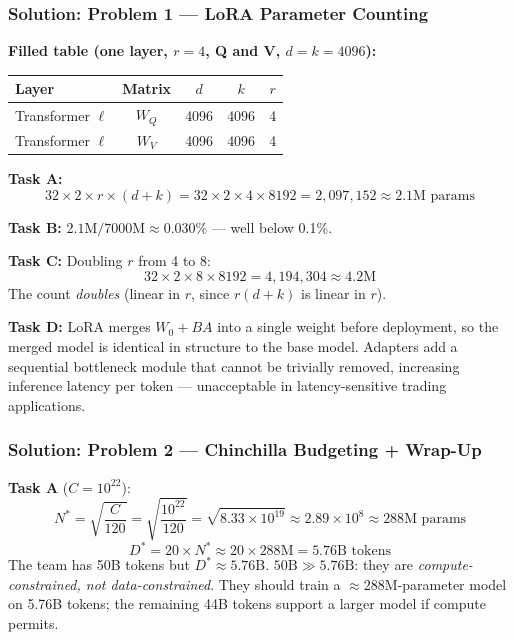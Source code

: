 \documentclass[9pt,t]{beamer}
\begin{document}
\begin{frame}
\frametitle{Solution: Problem 1 --- LoRA Parameter Counting}

\textbf{Filled table (one layer, $r=4$, Q and V, $d=k=4096$):}

\begin{center}
\begin{tabular}{lcccc}
\toprule
\textbf{Layer} & \textbf{Matrix} & \textbf{$d$} & \textbf{$k$} & \textbf{$r$} \\
\midrule
Transformer $\ell$ & $W_Q$ & 4096 & 4096 & 4 \\
Transformer $\ell$ & $W_V$ & 4096 & 4096 & 4 \\
\bottomrule
\end{tabular}
\end{center}

\medskip
\textbf{Task A:}
\[
  32 \times 2 \times r \times (d + k)
  = 32 \times 2 \times 4 \times 8192
  = 2{,}097{,}152 \approx 2.1\text{M params}
\]

\textbf{Task B:} $2.1\text{M} / 7000\text{M} \approx 0.030\%$ --- well below 0.1\%.

\textbf{Task C:} Doubling $r$ from 4 to 8:
\[
  32 \times 2 \times 8 \times 8192 = 4{,}194{,}304 \approx 4.2\text{M}
\]
The count \emph{doubles} (linear in $r$, since $r(d+k)$ is linear in $r$).

\textbf{Task D:} LoRA merges $W_0 + BA$ into a single weight before deployment,
so the merged model is identical in structure to the base model.
Adapters add a sequential bottleneck module that cannot be trivially removed,
increasing inference latency per token --- unacceptable in latency-sensitive
trading applications.
\end{frame}

\begin{frame}
\frametitle{Solution: Problem 2 --- Chinchilla Budgeting + Wrap-Up}

\textbf{Task A} ($C = 10^{22}$):
\[
  N^* = \sqrt{\frac{C}{120}} = \sqrt{\frac{10^{22}}{120}}
       = \sqrt{8.33 \times 10^{19}} \approx 2.89 \times 10^8 \approx 288\text{M params}
\]
\[
  D^* = 20 \times N^* \approx 20 \times 288\text{M} = 5.76\text{B tokens}
\]
The team has 50B tokens but $D^* \approx 5.76$B.
$50\text{B} \gg 5.76\text{B}$: they are \emph{compute-constrained, not data-constrained}.
They should train a $\approx 288$M-parameter model on 5.76B tokens; the remaining
44B tokens support a larger model if compute permits.
\end{frame}
\end{document}
